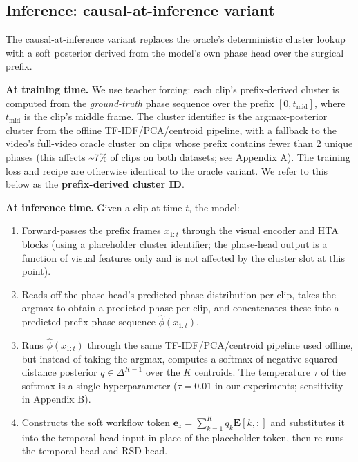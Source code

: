 \subsection{Inference: causal-at-inference variant}\label{inference-causal-at-inference-variant}

The causal-at-inference variant replaces the oracle's deterministic
cluster lookup with a soft posterior derived from the model's own phase
head over the surgical prefix.

\textbf{At training time.} We use teacher forcing: each clip's
prefix-derived cluster is computed from the \emph{ground-truth} phase
sequence over the prefix \([0, t_{\text{mid}}]\), where
\(t_{\text{mid}}\) is the clip's middle frame. The cluster identifier is
the argmax-posterior cluster from the offline TF-IDF/PCA/centroid
pipeline, with a fallback to the video's full-video oracle cluster on
clips whose prefix contains fewer than 2 unique phases (this affects
\textasciitilde7\% of clips on both datasets; see Appendix A). The
training loss and recipe are otherwise identical to the oracle variant.
We refer to this below as the \textbf{prefix-derived cluster ID}.

\textbf{At inference time.} Given a clip at time \(t\), the model:

\begin{enumerate}
\def\labelenumi{\arabic{enumi}.}
\tightlist
\item
  Forward-passes the prefix frames \(x_{1:t}\) through the visual
  encoder and HTA blocks (using a placeholder cluster identifier; the
  phase-head output is a function of visual features only and is not
  affected by the cluster slot at this point).
\item
  Reads off the phase-head's predicted phase distribution per clip,
  takes the argmax to obtain a predicted phase per clip, and
  concatenates these into a predicted prefix phase sequence
  \(\hat\phi(x_{1:t})\).
\item
  Runs \(\hat\phi(x_{1:t})\) through the same TF-IDF/PCA/centroid
  pipeline used offline, but instead of taking the argmax, computes a
  softmax-of-negative-squared- distance posterior \(q \in \Delta^{K-1}\)
  over the \(K\) centroids. The temperature \(\tau\) of the softmax is a
  single hyperparameter (\(\tau = 0.01\) in our experiments; sensitivity
  in Appendix B).
\item
  Constructs the soft workflow token
  \(\mathbf{e}_z = \sum_{k=1}^K q_k \mathbf{E}[k,
  :]\) and substitutes it into the temporal-head input in place of the
  placeholder token, then re-runs the temporal head and RSD head.
\end{enumerate}

